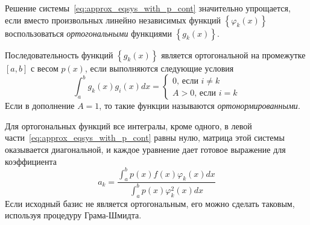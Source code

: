 Решение системы~\eqref{eq:approx_eqsys_with_p_cont} значительно упрощается, если вместо произвольных линейно независимых
функций $\left\{ \varphi_k (x) \right\}$ воспользоваться \emph{ортогональными} функциями $\left\{ g_k(x) \right\}$.
\begin{definition}
    Последовательность функций $\left\{ g_k(x) \right\}$ является ортогональной на промежутке $[a, b]$ с весом $p(x)$,
    если выполняются следующие условия
    \begin{equation*}
        \int_{a}^{b} g_k(x)g_i(x)dx =
        \begin{cases}
            0\text{, если } i \neq k\\
            A > 0\text{, если } i = k
        \end{cases}
    \end{equation*}
    Если в дополнение $A = 1$, то такие функции называются \emph{ортонормированными}.
\end{definition}
Для ортогональных функций все интегралы, кроме одного, в левой части~\eqref{eq:approx_eqsys_with_p_cont} равны нулю,
матрица этой системы оказывается диагональной, и каждое уравнение дает готовое выражение для коэффициента
\begin{equation}
    a_k = \frac{\displaystyle \int_{a}^{b} p(x)f(x)\varphi_k(x)dx}{\displaystyle \int_{a}^{b} p(x)\varphi_k^2(x)dx}
\end{equation}
Если исходный базис не является ортогональным, его можно сделать таковым, используя процедуру Грама-Шмидта.

